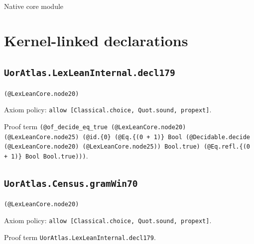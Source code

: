 \documentclass[11pt]{article}
\begin{document}
\begin{center}{\LARGE Native core module}\end{center}
\section*{Kernel-linked declarations}
\subsection*{\texttt{UorAtlas.LexLeanInternal.decl179}}
\noindent\texttt{(@LexLeanCore.node20)}\par
\noindent Axiom policy: \texttt{allow [Classical.choice, Quot.sound, propext]}.\par
\noindent Proof term \texttt{(@of\_decide\_eq\_true (@LexLeanCore.node20) (@LexLeanCore.node25) (@id.\{0\} (@Eq.\{(0 + 1)\} Bool (@Decidable.decide (@LexLeanCore.node20) (@LexLeanCore.node25)) Bool.true) (@Eq.refl.\{(0 + 1)\} Bool Bool.true)))}.\par
\subsection*{\texttt{UorAtlas.Census.gramWin70}}
\noindent\texttt{(@LexLeanCore.node20)}\par
\noindent Axiom policy: \texttt{allow [Classical.choice, Quot.sound, propext]}.\par
\noindent Proof term \texttt{UorAtlas.LexLeanInternal.decl179}.\par
\end{document}
